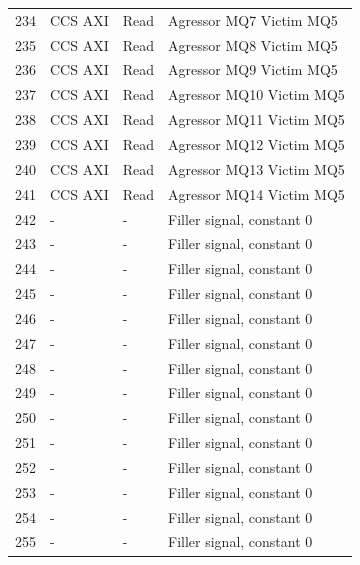 \begin{center}
\begin{longtable}{|l|l|l|l|}
234 & CCS AXI & Read &  Agressor MQ7 Victim MQ5\\
235 & CCS AXI & Read &  Agressor MQ8 Victim MQ5\\
236 & CCS AXI & Read &  Agressor MQ9 Victim MQ5\\
237 & CCS AXI & Read &  Agressor MQ10 Victim MQ5\\
238 & CCS AXI & Read &  Agressor MQ11 Victim MQ5\\
239 & CCS AXI & Read &  Agressor MQ12 Victim MQ5\\
240 & CCS AXI & Read &  Agressor MQ13 Victim MQ5\\
241 & CCS AXI & Read &  Agressor MQ14 Victim MQ5\\
242 & - & - &   Filler signal, constant 0 \\
243 & - & - &   Filler signal, constant 0 \\
244 & - & - &   Filler signal, constant 0 \\
245 & - & - &   Filler signal, constant 0 \\
246 & - & - &   Filler signal, constant 0 \\
247 & - & - &   Filler signal, constant 0 \\
248 & - & - &   Filler signal, constant 0 \\
249 & - & - &   Filler signal, constant 0 \\
250 & - & - &   Filler signal, constant 0 \\
251 & - & - &   Filler signal, constant 0 \\
252 & - & - &   Filler signal, constant 0 \\
253 & - & - &   Filler signal, constant 0 \\
254 & - & - &   Filler signal, constant 0 \\
255 & - & - &   Filler signal, constant 0 \\
	\end{longtable}
\end{center}

